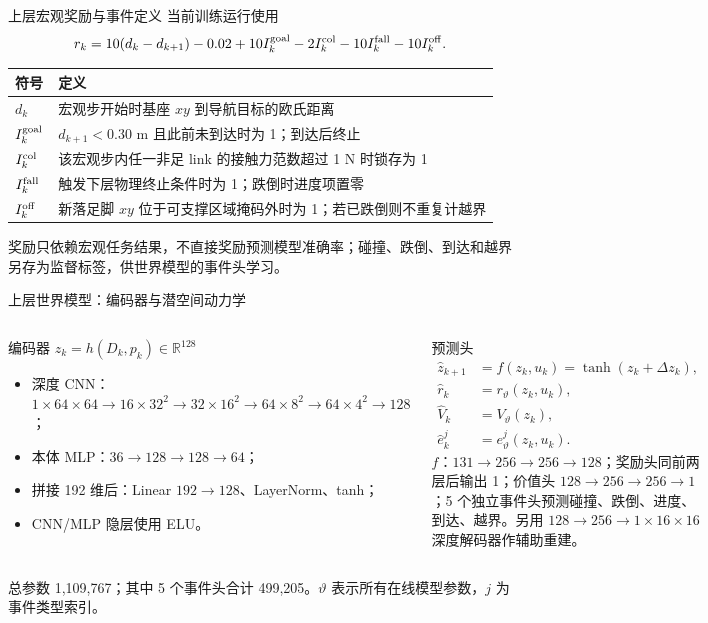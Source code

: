 \documentclass[aspectratio=169,10pt]{beamer}
\begin{document}
\begin{frame}{上层宏观奖励与事件定义}
\small
当前训练运行使用
\[
r_k=10(d_k-d_{k+1})-0.02+10I_k^{\rm goal}-2I_k^{\rm col}
-10I_k^{\rm fall}-10I_k^{\rm off}.
\]
\begin{tabular}{p{}p{}}
\toprule
符号 & 定义\\
\midrule
$d_k$ & 宏观步开始时基座 $xy$ 到导航目标的欧氏距离\\
$I_k^{\rm goal}$ & $d_{k+1}<0.30$ m 且此前未到达时为 1；到达后终止\\
$I_k^{\rm col}$ & 该宏观步内任一非足 link 的接触力范数超过 1 N 时锁存为 1\\
$I_k^{\rm fall}$ & 触发下层物理终止条件时为 1；跌倒时进度项置零\\
$I_k^{\rm off}$ & 新落足脚 $xy$ 位于可支撑区域掩码外时为 1；若已跌倒则不重复计越界\\
\bottomrule
\end{tabular}
\vspace{0.4em}
奖励只依赖宏观任务结果，不直接奖励预测模型准确率；碰撞、跌倒、到达和越界另存为监督标签，供世界模型的事件头学习。
\end{frame}

\begin{frame}{上层世界模型：编码器与潜空间动力学}
\scriptsize
\begin{columns}[T,onlytextwidth]
\begin{block}{编码器 $z_k=h(D_k,p_k)\in\mathbb{R}^{128}$}
\begin{itemize}
  \item 深度 CNN：$1\!\times\!64\!\times\!64\rightarrow16\!\times\!32^2\rightarrow32\!\times\!16^2\rightarrow64\!\times\!8^2\rightarrow64\!\times\!4^2\rightarrow128$；
  \item 本体 MLP：$36\rightarrow128\rightarrow128\rightarrow64$；
  \item 拼接 192 维后：Linear $192\rightarrow128$、LayerNorm、tanh；
  \item CNN/MLP 隐层使用 ELU。
\end{itemize}
\end{block}
\begin{block}{预测头}
\begin{align*}
\hat z_{k+1}&=f(z_k,u_k)=\tanh(z_k+\Delta z_k),\\
\hat r_k&=r_\vartheta(z_k,u_k),\\
\hat V_k&=V_\vartheta(z_k),\\
\hat e_k^j&=e_\vartheta^j(z_k,u_k).
\end{align*}
$f$：$131\rightarrow256\rightarrow256\rightarrow128$；奖励头同前两层后输出 1；价值头 $128\rightarrow256\rightarrow256\rightarrow1$；5 个独立事件头预测碰撞、跌倒、进度、到达、越界。另用 $128\rightarrow256\rightarrow1\times16\times16$ 深度解码器作辅助重建。
\end{block}
\end{columns}
总参数 1,109,767；其中 5 个事件头合计 499,205。$\vartheta$ 表示所有在线模型参数，$j$ 为事件类型索引。
\end{frame}
\end{document}
